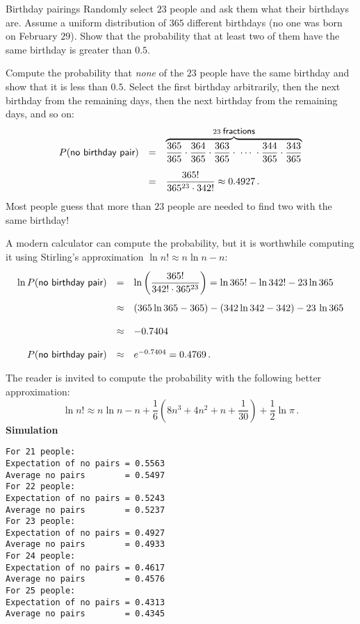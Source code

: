 

\begin{prob}{Birthday pairings}
Randomly select $23$ people and ask them what their birthdays are. Assume a uniform distribution of $365$ different birthdays (no one was born on February $29$). Show that the probability that at least two of them have the same birthday is greater than $0.5$.
\end{prob}

\solution{}

Compute the probability that \emph{none} of the $23$ people have the same birthday and show that it is less than $0.5$. Select the first birthday arbitrarily, then the next birthday from the remaining days, then the next birthday from the remaining days, and so on:
\[
\renewcommand*{\arraystretch}{2.5}
\begin{array}{rcl}
P(\textsf{no birthday pair})&=&
  \overbrace{\disfrac{365}{365}\cdot\frac{364}{365}
  \cdot\frac{363}{365}\cdot \;\cdots \; \cdot \frac{344}{365}
  \cdot\frac{343}{365}}^{23\;\textsf{\small fractions}}\\
&=&\disfrac{365!}{365^{23}\cdot 342!}\approx 0.4927\,.
\end{array}
\]
Most people guess that more than $23$ people are needed to find two with the same birthday!

A modern calculator can compute the probability, but it is worthwhile computing it using Stirling's approximation $\ln n! \approx n\ln n - n$:
\[
\renewcommand*{\arraystretch}{2}
\begin{array}{rcl}
\ln P(\textsf{no birthday pair})&=&
  \ln\left(\disfrac{365!}{342!\cdot 365^{23}}\right)=\ln 365! - \ln 342! -23 \ln 365\\
&\approx& (365\ln 365 -365) - (342\ln 342 -342) - 23\,\ln 365 \\
&\approx&-0.7404\\
P(\textsf{no birthday pair})&\approx&e^{-0.7404}=0.4769\,.
\end{array}
\]
The reader is invited to compute the probability with the following better approximation:
\[
\ln n!  \approx n\ln n - n + \frac{1}{6}\left(8n^3+4n^2+n+\frac{1}{30}\right)+\frac{1}{2}\ln\pi\,.
\]
\textbf{Simulation}
\begin{verbatim}
For 21 people:
Expectation of no pairs = 0.5563
Average no pairs        = 0.5497
For 22 people:
Expectation of no pairs = 0.5243
Average no pairs        = 0.5237
For 23 people:
Expectation of no pairs = 0.4927
Average no pairs        = 0.4933
For 24 people:
Expectation of no pairs = 0.4617
Average no pairs        = 0.4576
For 25 people:
Expectation of no pairs = 0.4313
Average no pairs        = 0.4345
\end{verbatim}

